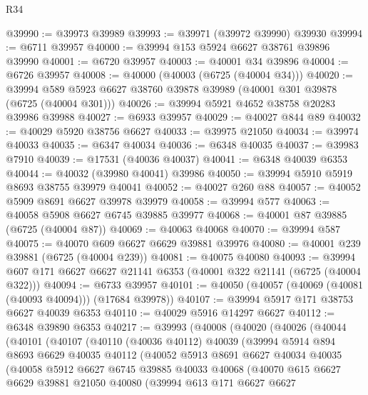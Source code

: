 \begin{lexlean}{R34}
\begin{coremodule}
@39990 := @39973 @39989
@39993 := @39971 (@39972 @39990) @39930
@39994 := @6711 @39957
@40000 := @39994 @153 @5924 @6627 @38761 @39896 @39990
@40001 := @6720 @39957
@40003 := @40001 @34 @39896
@40004 := @6726 @39957
@40008 := @40000 (@40003 (@6725 (@40004 @34)))
@40020 := @39994 @589 @5923 @6627 @38760 @39878 @39989 (@40001 @301 @39878 (@6725 (@40004 @301)))
@40026 := @39994 @5921 @4652 @38758 @20283 @39986 @39988
@40027 := @6933 @39957
@40029 := @40027 @844 @89
@40032 := @40029 @5920 @38756 @6627
@40033 := @39975 @21050
@40034 := @39974 @40033
@40035 := @6347 @40034
@40036 := @6348 @40035
@40037 := @39983 @7910
@40039 := @17531 (@40036 @40037)
@40041 := @6348 @40039 @6353
@40044 := @40032 (@39980 @40041) @39986
@40050 := @39994 @5910 @5919 @8693 @38755 @39979 @40041
@40052 := @40027 @260 @88
@40057 := @40052 @5909 @8691 @6627 @39978 @39979
@40058 := @39994 @577
@40063 := @40058 @5908 @6627 @6745 @39885 @39977
@40068 := @40001 @87 @39885 (@6725 (@40004 @87))
@40069 := @40063 @40068
@40070 := @39994 @587
@40075 := @40070 @609 @6627 @6629 @39881 @39976
@40080 := @40001 @239 @39881 (@6725 (@40004 @239))
@40081 := @40075 @40080
@40093 := @39994 @607 @171 @6627 @6627 @21141 @6353 (@40001 @322 @21141 (@6725 (@40004 @322)))
@40094 := @6733 @39957
@40101 := @40050 (@40057 (@40069 (@40081 (@40093 @40094))) (@17684 @39978))
@40107 := @39994 @5917 @171 @38753 @6627 @40039 @6353
@40110 := @40029 @5916 @14297 @6627
@40112 := @6348 @39890 @6353
@40217 := @39993
    (@40008
      (@40020
        (@40026
          (@40044
            (@40101
              (@40107
                (@40110
                  (@40036 @40112)
                  @40039
                  (@39994
                    @5914
                    @894
                    @8693
                    @6629
                    @40035
                    @40112
                    (@40052
                      @5913
                      @8691
                      @6627
                      @40034
                      @40035
                      (@40058
                        @5912
                        @6627
                        @6745
                        @39885
                        @40033
                        @40068
                        (@40070
                          @615
                          @6627
                          @6629
                          @39881
                          @21050
                          @40080
                          (@39994
                            @613
                            @171
                            @6627
                            @6627

\end{coremodule}
\end{lexlean}
